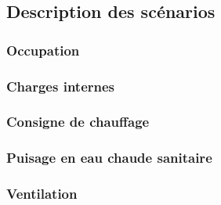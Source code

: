 \subsection{Description des scénarios} %
\label{sub:description_des_scenarios}
\subsubsection{Occupation} %
\label{ssub:profil_d_occupation}



\subsubsection{Charges internes} %
\label{ssub:charges_internes}



\subsubsection{Consigne de chauffage} %
\label{ssub:consigne_de_chauffage}



\subsubsection{Puisage en eau chaude sanitaire} %
\label{ssub:puisage_en_eau_chaude_sanitaire}



\subsubsection{Ventilation} %
\label{ssub:ventilation}














